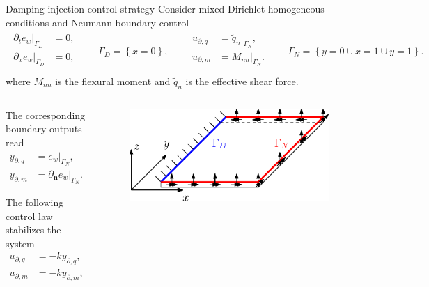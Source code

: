 \documentclass[aspectratio=169]{ISAE-Beamer}
\begin{document}
\begin{frame}{Damping injection control strategy}
Consider mixed Dirichlet homogeneous conditions and Neumann boundary control
\begin{align*}
	\begin{aligned}
		\partial_t e_w|_{\Gamma_D} &= 0, \\
		\partial_x e_w|_{\Gamma_D} &= 0, \\
	\end{aligned} \qquad {\Gamma_D} = \left\{x = 0 \right\}, \qquad
	\begin{aligned}
		u_{\partial, q} & = \widetilde{q}_n|_{\Gamma_N},\\
		u_{\partial, m} &= M_{nn}|_{\Gamma_N}.\\
	\end{aligned} \qquad {\Gamma_N} = \left\{y = 0 \cup x=1 \cup y=1 \right\}.
\end{align*}
where $M_{nn}$ is the flexural moment and $\widetilde{q}_n$ is the effective shear force. \vspace{.5cm}
\begin{columns}
	\setlength{\abovedisplayskip}{5pt}
	\setlength{\belowdisplayskip}{5pt}
	\begin{column}{.5\textwidth}
		The corresponding boundary outputs read
		\begin{equation*}
			\begin{aligned}
				y_{\partial, q} &= e_w|_{\Gamma_N}, \\
				y_{\partial, m} &=\partial_{\bm{n}} e_w|_{\Gamma_N}.
			\end{aligned}
		\end{equation*}
		
		The following control law stabilizes the system\footnotemark
		\begin{equation*}
			\begin{aligned}
				u_{\partial, q} & = - k y_{\partial, q}, \\
				u_{\partial, m} & = - k y_{\partial, m}, \\
			\end{aligned} \qquad k>0.
		\end{equation*}
		
	\end{column}
	
	\begin{column}{.5\textwidth}
		\begin{figure}[b]
			\centering
			\includegraphics[width=0.9\columnwidth]{bs_Kirchh/plate_controlled.eps}
		\end{figure}
	\end{column}
\end{columns}


\end{frame}
\end{document}
